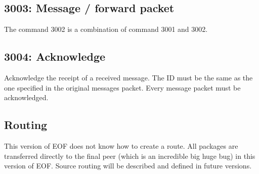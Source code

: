 \subsection{3003: Message / forward packet}
The command 3002 is a combination of command 3001 and 3002.
\subsection{3004: Acknowledge}
Acknowledge the receipt of a received message. The ID must be the same as
the one specified in the original messages packet.
Every message packet must be acknowledged.
\subsection{Routing}
This version of EOF does not know how to create a route.
All packages are transferred directly to the final peer (which is an
incredible big huge bug) in this version of EOF. Source routing will be
described and defined in future versions.

